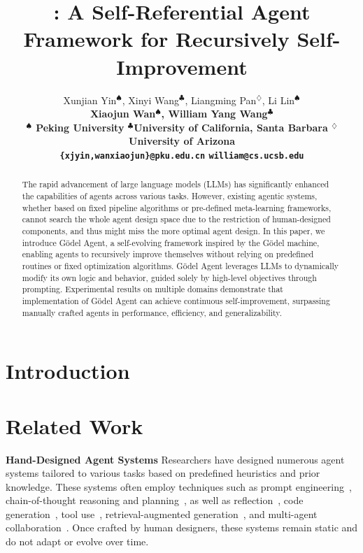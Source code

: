 \documentclass[11pt]{article}
\title{\framework{}: A Self-Referential Agent Framework for Recursively Self-Improvement}
\author{ 
 Xunjian Yin$^{\spadesuit}$\hspace{0.5mm},
 Xinyi Wang$^{\clubsuit}$\hspace{0.5mm},
 Liangming Pan$^{\diamondsuit}$\hspace{0.5mm}, 
 Li Lin$^{\spadesuit}$\hspace{0.5mm}
 \\
 \bf{Xiaojun Wan$^\spadesuit$\hspace{0.5mm},
 William Yang Wang$^\clubsuit$}
\hspace{0.2mm}\hspace{1.5mm} \\
$^\spadesuit$ Peking University \quad$^\clubsuit$University of California, Santa Barbara  \quad $^\diamondsuit$ University of Arizona \\
 \texttt{\{xjyin,wanxiaojun\}@pku.edu.cn} \quad \texttt{william@cs.ucsb.edu} 
}
\newcommand{\godel}{G\"odel\xspace}
\newcommand{\framework}{Gödel Agent\xspace}
\newcommand{\method}{Roz\xspace}
\begin{document}
\maketitle

\begin{abstract}
The rapid advancement of large language models (LLMs) has significantly enhanced the capabilities of agents across various tasks. However, existing agentic systems, whether based on fixed pipeline algorithms or pre-defined meta-learning frameworks, cannot search the whole agent design space due to the restriction of human-designed components, and thus might miss the more optimal agent design. In this paper, we introduce \framework, a self-evolving framework inspired by the \godel machine, enabling agents to recursively improve themselves without relying on predefined routines or fixed optimization algorithms. \framework leverages LLMs to dynamically modify its own logic and behavior, guided solely by high-level objectives through prompting. Experimental results on multiple domains demonstrate that implementation of \framework can achieve continuous self-improvement, surpassing manually crafted agents in performance, efficiency, and generalizability. 
\end{abstract}

\section{Introduction}


\section{Related Work}

\textbf{Hand-Designed Agent Systems} \quad
Researchers have designed numerous agent systems tailored to various tasks based on predefined heuristics and prior knowledge. These systems often employ techniques such as prompt engineering~\citep{chen2023unleashing,schulhoff2024prompt}, chain-of-thought reasoning and planning~\citep{wei2022chain,yao2022react}, as well as reflection~\citep{shinn2024reflexion,madaan2024self}, code generation~\citep{wang2023voyager,vemprala2024chatgpt}, tool use~\citep{nakano2021webgpt,qu2024tool}, retrieval-augmented generation~\citep{lewis2020retrieval,zhang2024survey}, and multi-agent collaboration~\citep{xu2023expertpromptinginstructinglargelanguage,wu2023autogen,qian2023communicative,hong2023metagpt}. Once crafted by human designers, these systems remain static and do not adapt or evolve over time.
\end{document}
